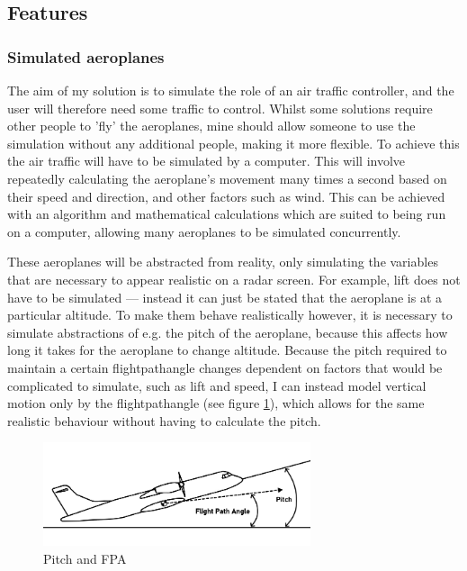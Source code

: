 \documentclass{article}
\begin{document}
\subsection{Features} \label{essentialfeatures}
\subsubsection{Simulated aeroplanes}
The aim of my solution is to simulate the role of an air traffic controller, and the user will therefore need some traffic to control.
Whilst some solutions require other people to 'fly' the aeroplanes, mine should allow someone to use the simulation without any additional people, making it more flexible.
To achieve this the air traffic will have to be simulated by a computer.
This will involve repeatedly calculating the aeroplane's movement many times a second based on their speed and direction, and other factors such as wind.
This can be achieved with an algorithm and mathematical calculations which are suited to being run on a computer, allowing many aeroplanes to be simulated concurrently.

These aeroplanes will be abstracted from reality, only simulating the variables that are necessary to appear realistic on a radar screen.
For example, lift does not have to be simulated --- instead it can just be stated that the aeroplane is at a particular altitude.
To make them behave realistically however, it is necessary to simulate abstractions of e.g.
the pitch of the aeroplane, because this affects how long it takes for the aeroplane to change altitude.
Because the pitch required to maintain a certain \gls{flightpathangle} changes dependent on factors that would be complicated to simulate, such as lift and speed, I can instead model vertical motion only by the \gls{flightpathangle} (see figure \ref{fig:pitchfpa}), which allows for the same realistic behaviour without having to calculate the pitch.

\begin{figure}[H]
\centering
\includegraphics[width=0.7\textwidth]{diagrams/pitchfpa.png}
\caption{\label{fig:pitchfpa}Pitch and FPA}
\end{figure}
\end{document}
